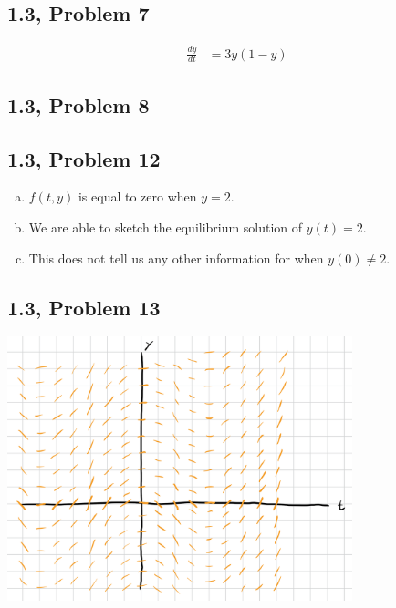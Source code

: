 \documentclass[10pt]{mypackage}
\begin{document}
\subsection{1.3, Problem 7}%
\begin{center}
\begin{align*}
  \frac{dy}{dt} &= 3y\left(1-y\right)
\end{align*}
\end{center}
\subsection{1.3, Problem 8}%
\subsection{1.3, Problem 12}%
\begin{enumerate}[(a)]
  \item $f(t,y)$ is equal to zero when $y = 2$.
  \item We are able to sketch the equilibrium solution of $y(t) = 2$.
  \item This does not tell us any other information for when $y(0) \neq 2$.
\end{enumerate}
\subsection{1.3, Problem 13}%
\begin{center}
  \includegraphics[width=10cm]{images/1_3_13.png}
\end{center}
\end{document}
